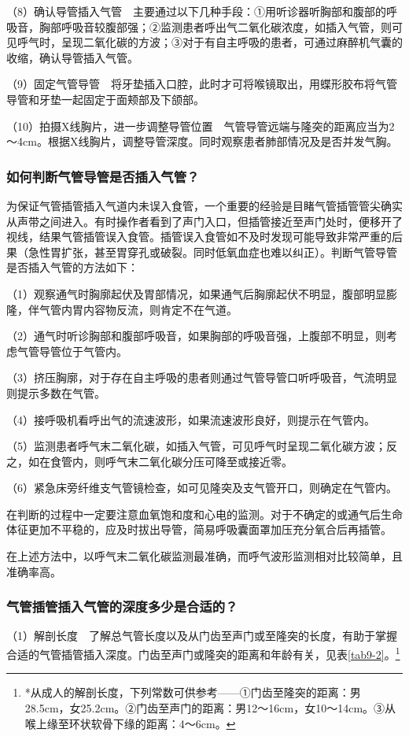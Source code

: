 （8）确认导管插入气管　主要通过以下几种手段：①用听诊器听胸部和腹部的呼吸音，胸部呼吸音较腹部强；②监测患者呼出气二氧化碳浓度，如插入气管，则可见呼气时，呈现二氧化碳的方波；③对于有自主呼吸的患者，可通过麻醉机气囊的收缩，确认导管插入气管。

（9）固定气管导管　将牙垫插入口腔，此时才可将喉镜取出，用蝶形胶布将气管导管和牙垫一起固定于面颊部及下颌部。

（10）拍摄X线胸片，进一步调整导管位置　气管导管远端与隆突的距离应当为2～4cm。根据X线胸片，调整导管深度。同时观察患者肺部情况及是否并发气胸。

\subsubsection{如何判断气管导管是否插入气管？}

为保证气管插管插入气道内未误入食管，一个重要的经验是目睹气管插管管尖确实从声带之间进入。有时操作者看到了声门入口，但插管接近至声门处时，便移开了视线，结果气管插管误入食管。插管误入食管如不及时发现可能导致非常严重的后果（急性胃扩张，甚至胃穿孔或破裂。同时低氧血症也难以纠正）。判断气管导管是否插入气管的方法如下：

（1）观察通气时胸廓起伏及胃部情况，如果通气后胸廓起伏不明显，腹部明显膨隆，伴气管内胃内容物反流，则肯定不在气道。

（2）通气时听诊胸部和腹部呼吸音，如果胸部的呼吸音强，上腹部不明显，则考虑气管导管位于气管内。

（3）挤压胸廓，对于存在自主呼吸的患者则通过气管导管口听呼吸音，气流明显则提示多数在气管。

（4）接呼吸机看呼出气的流速波形，如果流速波形良好，则提示在气管内。

（5）监测患者呼气末二氧化碳，如插入气管，可见呼气时呈现二氧化碳方波；反之，如在食管内，则呼气末二氧化碳分压可降至或接近零。

（6）紧急床旁纤维支气管镜检查，如可见隆突及支气管开口，则确定在气管内。

在判断的过程中一定要注意血氧饱和度和心电的监测。对于不确定的或通气后生命体征更加不平稳的，应及时拔出导管，简易呼吸囊面罩加压充分氧合后再插管。

在上述方法中，以呼气末二氧化碳监测最准确，而呼气波形监测相对比较简单，且准确率高。

\subsubsection{气管插管插入气管的深度多少是合适的？}

（1）解剖长度　了解总气管长度以及从门齿至声门或至隆突的长度，有助于掌握合适的气管插管插入深度。门齿至声门或隆突的距离和年龄有关，见表\ref{tab9-2}。\footnote{*从成人的解剖长度，下列常数可供参考------①门齿至隆突的距离：男28.5cm，女25.2cm。②门齿至声门的距离：男12～16cm，女10～14cm。③从喉上缘至环状软骨下缘的距离：4～6cm。}

